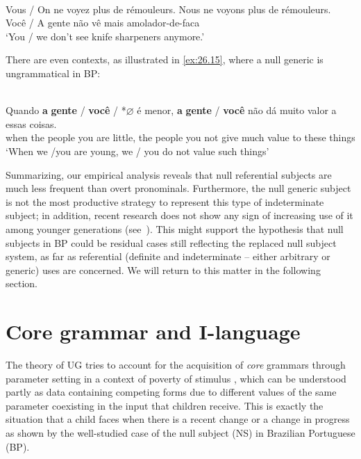 \documentclass[output=paper]{langsci/langscibook}
\begin{document}
\ea\label{ex:26.14}
    \ea {}\\
        Vous / On ne voyez  plus de rémouleurs. Nous ne voyons plus de rémouleurs.
    \ex{}\\
        Você / A gente não vê  mais amolador-de-faca\\
        ‘You / we don't see knife sharpeners anymore.’
    \z
\z

There are even contexts, as illustrated in \eqref{ex:26.15}, where a null
generic is ungrammatical in \gls{BP}:

\ea%
    \label{ex:26.15}\\
    \gll	Quando \textbf{a} \textbf{gente} / \textbf{você} / *$\varnothing$\textbf{\tss{\Genc}} é  menor, \textbf{a} \textbf{gente} / \textbf{você} não dá muito valor a essas coisas.\\
            when the people {} you {} {} are little, the people {} you not  give much value to these things\\
	\glt	\enquote*{When we /you are young, we / you do not value such things}
\z

Summarizing, our empirical analysis reveals that null referential subjects are
much less frequent than overt pronominals. Furthermore, the null generic
subject is not the most productive strategy to represent this type of
indeterminate subject; in addition, recent research does not show any sign of
increasing use of it among younger generations (see~\citealt{MarinsEtAlta}).
This might support the hypothesis that null subjects in \gls{BP} could be residual cases still reflecting the replaced null subject
system, as far as referential (definite and indeterminate -- either arbitrary
or generic) uses are concerned. We will return to this matter in the following
section.

\section{Core grammar and I-language}\label{sec:26.2.3}

The theory of \gls{UG} tries to account for the acquisition of
\emph{core} grammars through parameter setting in a context of poverty of
stimulus \citep{Chomsky1986}, which can be understood partly as data containing
competing forms due to different values of the same parameter coexisting in the
input that children receive. This is exactly the situation that a child faces
when there is a recent change or a change in progress as shown by the
well-studied case of the null subject (NS) in Brazilian Portuguese (BP).
\end{document}
